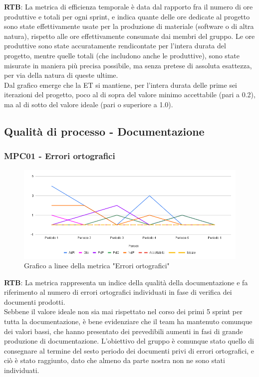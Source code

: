 \documentclass[10pt]{article}
\begin{document}
\begin{justify}
\textbf{RTB}: La metrica di efficienza temporale è data dal rapporto fra il numero di ore produttive e totali per ogni sprint, e indica quante delle ore dedicate al progetto
sono state effettivamente usate per la produzione di materiale (software o di altra natura), rispetto alle ore effettivamente consumate dai membri del gruppo. Le ore produttive sono state accuratamente rendicontate per l'intera durata del progetto, mentre quelle totali (che includono anche le produttive), sono state misurate in
maniera più precisa possibile, ma senza pretese di assoluta esattezza, per via della natura di queste ultime.\\
Dal grafico emerge che la ET si mantiene, per l'intera durata delle prime sei iterazioni del progetto, poco al di sopra del valore minimo accettabile (pari a 0.2), ma al di 
sotto del valore ideale (pari o superiore a 1.0).\\


\subsection{Qualità di processo - Documentazione}
\subsubsection{MPC01 - Errori ortografici}

\begin{figure}[H]
  \centering
  \includegraphics[width=0.9\linewidth]{EO.png}
  \caption{Grafico a linee della metrica "Errori ortografici"}
  \label{fig:EOchart}
\end{figure}

\textbf{RTB}: La metrica rappresenta un indice della qualità della documentazione e fa riferimento al numero di errori ortografici individuati in fase di verifica 
dei documenti prodotti.\\
Sebbene il valore ideale non sia mai rispettato nel corso dei primi 5 sprint per tutta la documentazione, è bene evidenziare che il team ha mantenuto comunque dei valori bassi, che hanno 
presentato dei prevedibili aumenti in fasi di grande produzione di documentazione. L'obiettivo del gruppo è comunque stato quello di consegnare al termine del sesto periodo
dei documenti privi di errori ortografici, e ciò è stato raggiunto, dato che almeno da parte nostra non ne sono stati individuati.\\



\end{justify}
\end{document}
